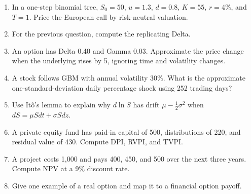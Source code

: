 \begin{enumerate}
    \item In a one-step binomial tree, $S_0=50$, $u=1.3$, $d=0.8$, $K=55$,
    $r=4\%$, and $T=1$. Price the European call by risk-neutral valuation.
    \item For the previous question, compute the replicating Delta.
    \item An option has Delta 0.40 and Gamma 0.03. Approximate the price change
    when the underlying rises by 5, ignoring time and volatility changes.
    \item A stock follows GBM with annual volatility 30\%. What is the
    approximate one-standard-deviation daily percentage shock using 252 trading
    days?
    \item Use It\^o's lemma to explain why $d\ln S$ has drift
    $\mu-\frac{1}{2}\sigma^2$ when $dS=\mu Sdt+\sigma Sdz$.
    \item A private equity fund has paid-in capital of 500, distributions of
    220, and residual value of 430. Compute DPI, RVPI, and TVPI.
    \item A project costs 1,000 and pays 400, 450, and 500 over the next three
    years. Compute NPV at a 9\% discount rate.
    \item Give one example of a real option and map it to a financial option
    payoff.
\end{enumerate}



